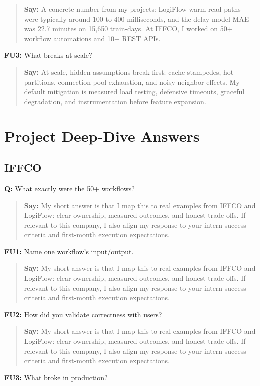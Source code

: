 \documentclass[9pt,a4paper]{article}
\begin{document}
\begin{quote}\small\textbf{Say:} A concrete number from my projects: LogiFlow warm read paths were typically around 100 to 400 milliseconds, and the delay model MAE was 22.7 minutes on 15,650 train-days. At IFFCO, I worked on 50+ workflow automations and 10+ REST APIs.\end{quote}
\vspace{2mm}
\textbf{FU3:} What breaks at scale?

\begin{quote}\small\textbf{Say:} At scale, hidden assumptions break first: cache stampedes, hot partitions, connection-pool exhaustion, and noisy-neighbor effects. My default mitigation is measured load testing, defensive timeouts, graceful degradation, and instrumentation before feature expansion.\end{quote}
\vspace{2mm}
\newpage\section{Project Deep-Dive Answers}
\subsection{IFFCO}
\textbf{Q:} What exactly were the 50+ workflows?

\begin{quote}\small\textbf{Say:} My short answer is that I map this to real examples from IFFCO and LogiFlow: clear ownership, measured outcomes, and honest trade-offs. If relevant to this company, I also align my response to your intern success criteria and first-month execution expectations.\end{quote}
\vspace{2mm}
\textbf{FU1:} Name one workflow's input/output.

\begin{quote}\small\textbf{Say:} My short answer is that I map this to real examples from IFFCO and LogiFlow: clear ownership, measured outcomes, and honest trade-offs. If relevant to this company, I also align my response to your intern success criteria and first-month execution expectations.\end{quote}
\vspace{2mm}
\textbf{FU2:} How did you validate correctness with users?

\begin{quote}\small\textbf{Say:} My short answer is that I map this to real examples from IFFCO and LogiFlow: clear ownership, measured outcomes, and honest trade-offs. If relevant to this company, I also align my response to your intern success criteria and first-month execution expectations.\end{quote}
\vspace{2mm}
\textbf{FU3:} What broke in production?
\end{document}

